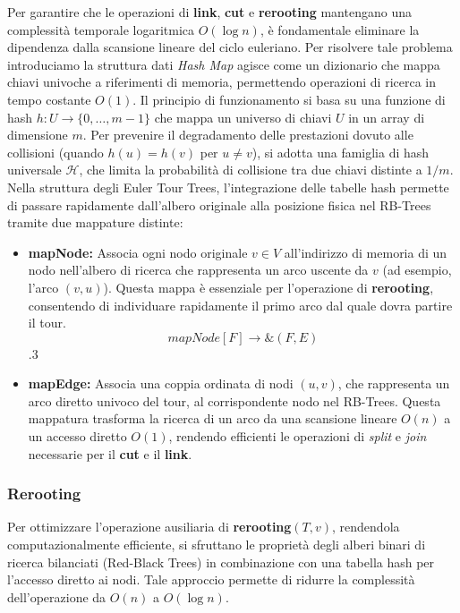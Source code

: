 Per garantire che le operazioni di \textbf{link}, \textbf{cut} e \textbf{rerooting} mantengano una complessità temporale logaritmica $O(\log n)$, è fondamentale eliminare la dipendenza dalla scansione lineare del ciclo euleriano. Per risolvere tale problema introduciamo la struttura dati \textit{Hash Map} agisce come un dizionario che mappa chiavi univoche a riferimenti di memoria, permettendo operazioni di ricerca in tempo costante $O(1)$.
Il principio di funzionamento si basa su una funzione di hash $h: U \to \{0, \dots, m-1\}$ che mappa un universo di chiavi $U$ in un array di dimensione $m$. Per prevenire il degradamento delle prestazioni dovuto alle collisioni (quando $h(u) = h(v)$ per $u \neq v$), si adotta una famiglia di hash universale $\mathcal{H}$, che limita la probabilità di collisione tra due chiavi distinte a $1/m$.
Nella struttura degli Euler Tour Trees, l'integrazione delle tabelle hash permette di passare rapidamente dall'albero originale alla posizione fisica nel RB-Trees tramite due mappature distinte:
\begin{itemize}
    \item \textbf{mapNode: } Associa ogni nodo originale $v \in V$ all'indirizzo di memoria di un nodo nell'albero di ricerca che rappresenta un arco uscente da $v$ (ad esempio, l'arco $(v, u)$). Questa mappa è essenziale per l'operazione di \textbf{rerooting}, consentendo di individuare rapidamente il primo arco dal quale dovra partire il tour.
    \[{mapNode}[F] \to \&(F, E)\].3
    \item \textbf{mapEdge: } Associa una coppia ordinata di nodi $(u, v)$, che rappresenta un arco diretto univoco del tour, al corrispondente nodo nel RB-Trees. Questa mappatura trasforma la ricerca di un arco da una scansione lineare $O(n)$ a un accesso diretto $O(1)$, rendendo efficienti le operazioni di \textit{split} e \textit{join} necessarie per il \textbf{cut} e il \textbf{link}.
\end{itemize}


\subsubsection{Rerooting}

Per ottimizzare l'operazione ausiliaria di \textbf{rerooting}$(T, v)$, rendendola computazionalmente efficiente, si sfruttano le proprietà degli alberi binari di ricerca bilanciati (Red-Black Trees) in combinazione con una tabella hash per l'accesso diretto ai nodi. Tale approccio permette di ridurre la complessità dell'operazione da $O(n)$ a $O(\log n)$.

